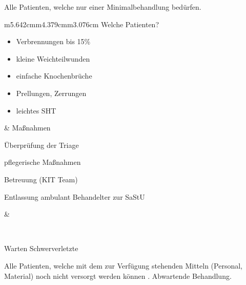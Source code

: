 \documentclass{article}
\begin{document}
Alle Patienten, welche nur einer Minimalbehandlung bed\"urfen. 

\begin{flushleft}
\tablehead{}\begin{supertabular}{m{5.642cm}m{4.379cm}m{3.076cm}}
Welche Patienten?

\begin{itemize}
\item Verbrennungen bis 15\%

\item kleine Weichteilwunden

\item einfache Knochenbr\"uche

\item Prellungen, Zerrungen

\item leichtes SHT

\end{itemize}
 &
Ma{\ss}nahmen

\"Uberpr\"ufung der Triage

pflegerische Ma{\ss}nahmen

Betreuung (KIT Team)

Entlassung ambulant Behandelter zur SaStU

 &
 \par

\\
\end{supertabular}
\end{flushleft}
Warten Schwerverletzte

Alle Patienten, welche mit dem zur Verf\"ugung stehenden Mitteln
(Personal, Material) noch nicht versorgt werden k\"onnen . Abwartende
Behandlung. 
\end{document}

